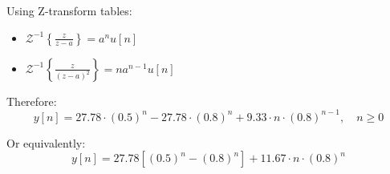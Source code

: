\begin{example}
Using Z-transform tables:
\begin{itemize}
    \item $\mathcal{Z}^{-1}\left\{\frac{z}{z-a}\right\} = a^n u[n]$
    \item $\mathcal{Z}^{-1}\left\{\frac{z}{(z-a)^2}\right\} = na^{n-1}u[n]$
\end{itemize}

Therefore:
\begin{equation}
\boxed{y[n] = 27.78 \cdot (0.5)^n - 27.78 \cdot (0.8)^n + 9.33 \cdot n \cdot (0.8)^{n-1}, \quad n \geq 0}
\end{equation}

Or equivalently:
\begin{equation}
y[n] = 27.78[(0.5)^n - (0.8)^n] + 11.67 \cdot n \cdot (0.8)^n
\end{equation}
\end{example}

